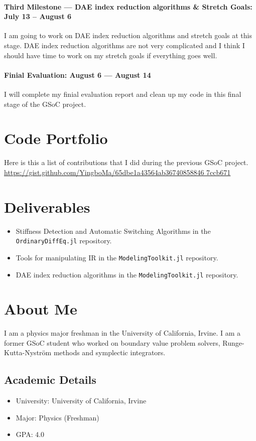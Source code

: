 \documentclass[12pt]{article}
\begin{document}
\paragraph{Third Milestone --- DAE index reduction algorithms \& Stretch Goals:
July 13 -- August 6}
I am going to work on DAE index reduction algorithms and stretch goals at this
stage. DAE index reduction algorithms are not very complicated and I think I
should have time to work on my stretch goals if everything goes well.

\paragraph{Finial Evaluation: August 6 --- August 14}
I will complete my finial evaluation report and clean up my code in this final
stage of the GSoC project.

\section{Code Portfolio}
Here is this a list of contributions that I did during the previous GSoC
project. \url{https://gist.github.com/YingboMa/65dbe1a43564ab36740858846
7ccb671}

\section{Deliverables}
\begin{itemize}
  \item Stiffness Detection and Automatic Switching Algorithms in
    the \texttt{OrdinaryDiffEq.jl} repository.
  \item Tools for manipulating IR in the \texttt{ModelingToolkit.jl}
    repository.
  \item DAE index reduction algorithms in the \texttt{ModelingToolkit.jl}
    repository.
\end{itemize}

\section{About Me}
I am a physics major freshman in the University of California, Irvine. I am a
former GSoC student who worked on boundary value problem solvers,
Runge-Kutta-Nystr{\"o}m methods and symplectic integrators.

\subsection{Academic Details}
\begin{itemize}
  \item University: University of California, Irvine
  \item Major: Physics (Freshman)
  \item GPA: 4.0
\end{itemize}
\end{document}
